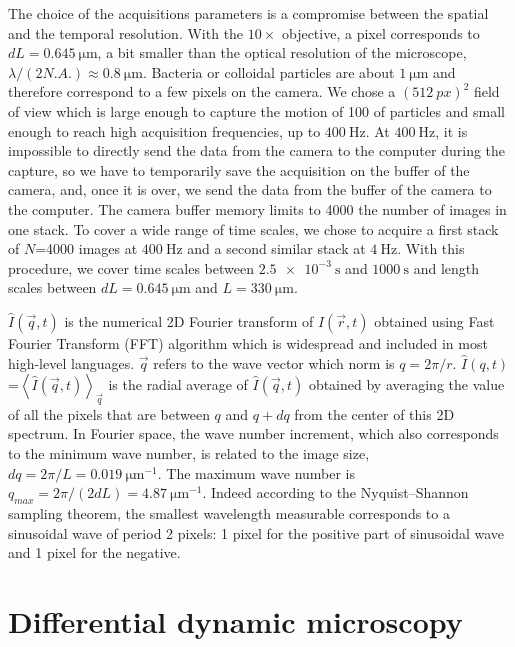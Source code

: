 \documentclass[prb,twocolumn,amsmath,amssymb]{revtex4-1}
\newcommand{\tgn}[1]{{\color{blue}#1}} %
\begin{document}
The choice of the acquisitions parameters is a compromise between the spatial and the temporal resolution. With the $10\times$ objective, a pixel corresponds to $dL=\SI{0.645}{\micro\meter}$, a bit smaller than the optical resolution of the microscope, $\lambda/(2N.A.)\approx\SI{0.8}{\micro\meter} $. Bacteria or colloidal particles are about $\SI{1}{\micro\meter}$ and therefore correspond to a few pixels on the camera. We chose a $(\SI{512}{px})^2$ field of view which is large enough to capture the motion of 100 of particles and small enough to reach high acquisition frequencies, up to $\SI{400}{\hertz}$. At $\SI{400}{\hertz}$, it is impossible to directly send the data from the camera to the computer during the capture, so we have to temporarily save the acquisition on the buffer of the camera, and, once it is over, we send the data from the buffer of the camera to the computer. The camera buffer memory limits  to 4000 the number of images in one stack. To cover a wide range of time scales, we chose to acquire a first stack of $N$=4000 images at $\SI{400}{\hertz}$ and a second similar stack at $\SI{4}{\hertz}$. With this procedure, we cover time scales between $\SI{2.5e-3}{\second}$ and $\SI{1000}{\second}$ and length scales between $dL=\SI{0.645}{\micro\meter}$ and $L=\SI{330}{\micro\meter}$. 

\tgn{$\hat{I}(\vec{q}, t)$ is the numerical 2D Fourier transform of $I(\vec{r}, t)$ obtained using Fast Fourier Transform (FFT) algorithm which is widespread and included in most high-level languages. $\vec{q}$ refers to the wave vector which norm is $q=2\pi/r$. $\hat{I}(q, t)$=$ \left\langle\hat{I}(\vec{q},t) \right\rangle_{\vec{q}}$ is the radial average of  $\hat{I}(\vec{q},t)$  obtained by averaging the value of all the pixels that are between $q$ and $q+dq$ from the center of this 2D spectrum}. In Fourier space, the wave number increment, which also corresponds to the minimum wave number, is related to the image size, $dq=2\pi/L=\SI{0.019}{\micro\meter^{-1}}$. The maximum wave number is $q_{max}=2\pi/(2dL)=\SI{4.87}{\micro\meter^{-1}}$. Indeed according to the Nyquist–Shannon sampling theorem, the smallest wavelength measurable corresponds to a sinusoidal wave of period 2 pixels: 1 pixel for the positive part of sinusoidal wave and 1 pixel for the negative.

\section{Differential dynamic microscopy}
\label{sec:ddm}
\end{document}
